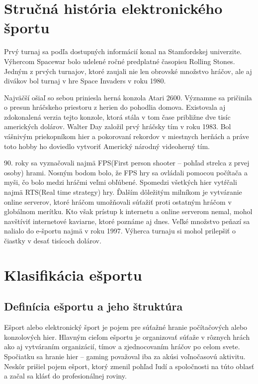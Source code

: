 \documentclass[10pt,oneside,slovak,a4paper]{article}
\begin{document}
\section{Stručná história elektronického športu} \label{historia}

Prvý turnaj sa podľa dostupných informácií konal na Stamfordskej univerzite. Výhercom Spacewar bolo udelené ročné predplatné časopisu Rolling Stones. Jedným z prvých turnajov, ktoré zaujali nie len obrovské množstvo hráčov, ale aj divákov bol turnaj v hre Space Invaders v roku 1980.

Najväčší ošiaľ so sebou priniesla herná konzola Atari 2600. Významne sa pričinila o presun hráčskeho priestoru z herien do pohodlia domova. Existovala aj zdokonalená verzia tejto konzole, ktorá stála v tom čase približne dve tisíc amerických dolárov. Walter Day založil prvý hráčsky tím v roku 1983. Bol vášnivým priekopníkom hier a pokorovaní rekordov v miestnych herňách a práve toto hobby ho doviedlo vytvoriť Americký národný videoherný tím.  

90. roky sa vyznačovali najmä FPS(First person shooter – pohľad strelca z prvej osoby) hrami. Nosným bodom bolo, že FPS hry sa ovládali pomocou počítača a myši, čo bolo medzi hráčmi veľmi obľúbené. Spomedzi všetkých hier vytŕčali najmä RTS(Real time strategy) hry. Ďalším dôležitým milníkom je vytváranie online serverov, ktoré hráčom umožňovali súťažiť proti ostatným hráčom v globálnom merítku. Kto však prístup k internetu a online serverom nemal, mohol navštíviť internetové kaviarne, ktoré poznáme aj dnes. Veľké množstvo peňazí sa nalialo do e-športu najmä v roku 1997. Výherca turnaju si mohol prilepšiť o čiastky v desať tisícoch dolárov. \cite{a1}


\section{Klasifikácia ešportu} \label{klasifikacia}

\subsection{Definícia ešportu a jeho štruktúra} \label{klasifikacia:definicia}

Ešport alebo elektronický šport je pojem pre súťažné hranie počítačových alebo konzolových hier. Hlavným cieľom ešportu je organizovať súťaže v rôznych hrách ako aj vytváraním organizácií, tímov a zjednocovaním hráčov po celom svete. Spočiatku sa hranie hier – gaming považoval iba za akúsi voľnočasovú aktivitu. Neskôr prišiel pojem ešport, ktorý zmenil pohľad ľudí a spoločnosti na túto oblasť a začal sa klásť do profesionálnej roviny.\cite{a3}
\end{document}
